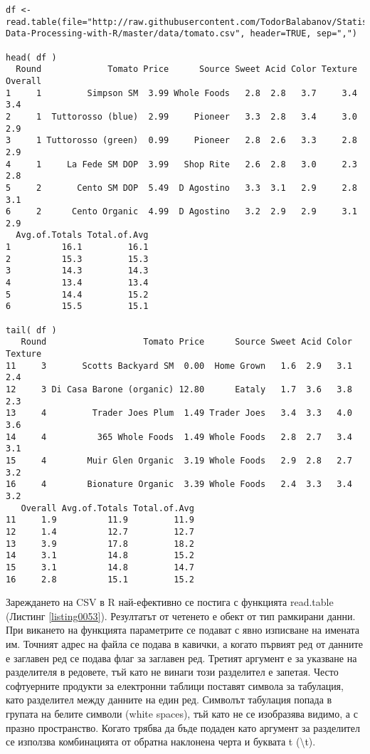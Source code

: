 \begin{lstlisting}[caption=Зареждане на данни от CSV файл, label=listing0053]
df <- read.table(file="http://raw.githubusercontent.com/TodorBalabanov/Statistical-Data-Processing-with-R/master/data/tomato.csv", header=TRUE, sep=",")

head( df )
  Round             Tomato Price      Source Sweet Acid Color Texture Overall
1     1         Simpson SM  3.99 Whole Foods   2.8  2.8   3.7     3.4     3.4
2     1  Tuttorosso (blue)  2.99     Pioneer   3.3  2.8   3.4     3.0     2.9
3     1 Tuttorosso (green)  0.99     Pioneer   2.8  2.6   3.3     2.8     2.9
4     1     La Fede SM DOP  3.99   Shop Rite   2.6  2.8   3.0     2.3     2.8
5     2       Cento SM DOP  5.49  D Agostino   3.3  3.1   2.9     2.8     3.1
6     2      Cento Organic  4.99  D Agostino   3.2  2.9   2.9     3.1     2.9
  Avg.of.Totals Total.of.Avg
1          16.1         16.1
2          15.3         15.3
3          14.3         14.3
4          13.4         13.4
5          14.4         15.2
6          15.5         15.1

tail( df )
   Round                   Tomato Price      Source Sweet Acid Color Texture
11     3       Scotts Backyard SM  0.00  Home Grown   1.6  2.9   3.1     2.4
12     3 Di Casa Barone (organic) 12.80      Eataly   1.7  3.6   3.8     2.3
13     4         Trader Joes Plum  1.49 Trader Joes   3.4  3.3   4.0     3.6
14     4          365 Whole Foods  1.49 Whole Foods   2.8  2.7   3.4     3.1
15     4        Muir Glen Organic  3.19 Whole Foods   2.9  2.8   2.7     3.2
16     4        Bionature Organic  3.39 Whole Foods   2.4  3.3   3.4     3.2
   Overall Avg.of.Totals Total.of.Avg
11     1.9          11.9         11.9
12     1.4          12.7         12.7
13     3.9          17.8         18.2
14     3.1          14.8         15.2
15     3.1          14.8         14.7
16     2.8          15.1         15.2
\end{lstlisting}

Зареждането на CSV в R най-ефективно се постига с функцията read.table (Листинг \ref{listing0053}). Резултатът от четенето е обект от тип рамкирани данни. При викането на функцията параметрите се подават с явно изписване на имената им. Точният адрес на файла се подава в кавички, а когато първият ред от данните е заглавен ред се подава флаг за заглавен ред. Третият аргумент е за указване на разделителя в редовете, тъй като не винаги този разделител е запетая. Често софтуерните продукти за електронни таблици поставят символа за табулация, като разделител между данните на един ред. Символът табулация попада в групата на белите символи (white spaces), тъй като не се изобразява видимо, а с празно пространство. Когато трябва да бъде подаден като аргумент за разделител се използва комбинацията от обратна наклонена черта и буквата t (\textbackslash t).

